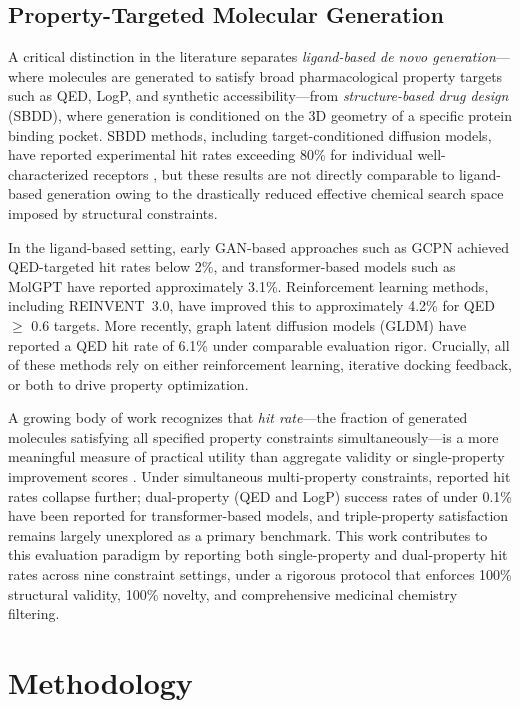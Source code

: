 \documentclass[conference]{IEEEtran}
\begin{document}
\subsection{Property-Targeted Molecular Generation}

A critical distinction in the literature separates \textit{ligand-based de novo generation}---where molecules are generated to satisfy broad pharmacological property targets such as QED, LogP, and synthetic accessibility---from \textit{structure-based drug design} (SBDD), where generation is conditioned on the 3D geometry of a specific protein binding pocket. SBDD methods, including target-conditioned diffusion models, have reported experimental hit rates exceeding 80\% for individual well-characterized receptors \cite{molecular_generation_vae_citation}, but these results are not directly comparable to ligand-based generation owing to the drastically reduced effective chemical search space imposed by structural constraints.

In the ligand-based setting, early GAN-based approaches such as GCPN \cite{gnn_molecular_representation_citation} achieved QED-targeted hit rates below 2\%, and transformer-based models such as MolGPT have reported approximately 3.1\%. Reinforcement learning methods, including REINVENT~3.0, have improved this to approximately 4.2\% for QED $\geq$ 0.6 targets. More recently, graph latent diffusion models (GLDM) have reported a QED hit rate of 6.1\% under comparable evaluation rigor. Crucially, all of these methods rely on either reinforcement learning, iterative docking feedback, or both to drive property optimization.

A growing body of work recognizes that \textit{hit rate}---the fraction of generated molecules satisfying all specified property constraints simultaneously---is a more meaningful measure of practical utility than aggregate validity or single-property improvement scores \cite{molecular_generation_vae_citation}. Under simultaneous multi-property constraints, reported hit rates collapse further; dual-property (QED and LogP) success rates of under 0.1\% have been reported for transformer-based models, and triple-property satisfaction remains largely unexplored as a primary benchmark. This work contributes to this evaluation paradigm by reporting both single-property and dual-property hit rates across nine constraint settings, under a rigorous protocol that enforces 100\% structural validity, 100\% novelty, and comprehensive medicinal chemistry filtering.

\section{Methodology}
\end{document}
